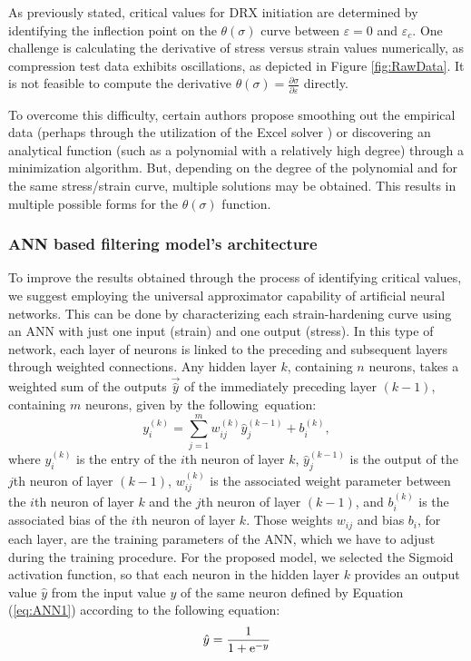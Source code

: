 \documentclass[metals,article,submit,pdftex,moreauthors]{Definitions/mdpi}
\DeclareRobustCommand{\e}[1]{{\rm e}^{#1}}
\DeclareRobustCommand{\lay}[1]{^{(#1)}}
\begin{document}
As previously stated, critical values for DRX initiation are determined by identifying the inflection point on the $\theta(\sigma)$ curve between $\varepsilon=0$ and $\varepsilon_c$.
One challenge is calculating the derivative of stress versus strain values numerically, as compression test data exhibits oscillations, as depicted in Figure \ref{fig:RawData}.
It is not feasible to compute the derivative $\theta(\sigma)=\frac{\partial \sigma}{\partial \varepsilon}$ directly.

To overcome this difficulty, certain authors propose smoothing out the empirical data (perhaps through the utilization of the Excel solver \cite{Najafizadeh-2006}) or discovering an analytical function (such as a polynomial with a relatively high degree) through a minimization algorithm.
But, depending on the degree of the polynomial and for the same stress/strain curve, multiple solutions may be obtained.
This results in multiple possible forms for the $\theta(\sigma)$ function.

\subsubsection{ANN based filtering model's architecture\label{subsec:ANNbasics}}

To improve the results obtained through the process of identifying critical values, we suggest employing the universal approximator capability of artificial neural networks.
This can be done by characterizing each strain-hardening curve using an ANN with just one input (strain) and one output (stress).
In this type of network, each layer of neurons is linked to the preceding and subsequent layers through weighted connections.
Any hidden layer $k$, containing $n$ neurons, takes a weighted sum of the outputs $\overrightarrow{\hat{y}}$ of the immediately preceding layer $(k-1)$, containing $m$ neurons, given by the following~equation:
\begin{equation}
y_i\lay{k} = \sum_{j=1}^m w_{ij}\lay{k} \hat{y}_j^{(k-1)}+ b_i\lay{k},\label{eq:ANN1}
\end{equation}
where $y_i\lay{k}$ is the entry of the $i$th neuron of layer $k$, $\hat{y}_j\lay{k-1}$ is the output of the $j$th neuron of layer $(k-1)$, $w_{ij}\lay{k}$ is the associated weight parameter between the $i$th neuron of layer $k$ and the $j$th neuron of layer $(k-1)$, and $b_i\lay{k}$ is the associated bias of the $i$th neuron of layer $k$.
Those weights $w_{ij}$ and bias $b_i$, for each layer, are the training parameters of the ANN, which we have to adjust during the training procedure.
For the proposed model, we selected the Sigmoid activation function, so that each neuron in the hidden layer $k$ provides an output value ${\hat{y}}$ from the input value $y$ of the same neuron defined by Equation (\ref{eq:ANN1}) according to the following equation:
\begin{equation}
\hat{y}=\frac{1}{1 + \e{-y}}\label{eq:ANN2}
\end{equation}
\end{document}
